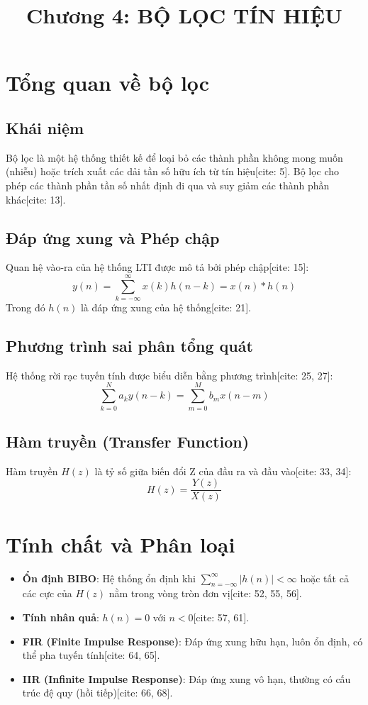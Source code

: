 \documentclass[12pt,a4paper]{article}
\title{Chương 4: BỘ LỌC TÍN HIỆU}
\date{}
\begin{document}
\maketitle

\section{Tổng quan về bộ lọc}
\subsection{Khái niệm}
Bộ lọc là một hệ thống thiết kế để loại bỏ các thành phần không mong muốn (nhiễu) hoặc trích xuất các dải tần số hữu ích từ tín hiệu[cite: 5]. Bộ lọc cho phép các thành phần tần số nhất định đi qua và suy giảm các thành phần khác[cite: 13].

\subsection{Đáp ứng xung và Phép chập}
Quan hệ vào-ra của hệ thống LTI được mô tả bởi phép chập[cite: 15]:
\begin{equation}
    y(n) = \sum_{k=-\infty}^{\infty} x(k)h(n-k) = x(n) * h(n)
\end{equation}
Trong đó $h(n)$ là đáp ứng xung của hệ thống[cite: 21].

\subsection{Phương trình sai phân tổng quát}
Hệ thống rời rạc tuyến tính được biểu diễn bằng phương trình[cite: 25, 27]:
\begin{equation}
    \sum_{k=0}^{N} a_k y(n-k) = \sum_{m=0}^{M} b_m x(n-m)
\end{equation}

\subsection{Hàm truyền (Transfer Function)}
Hàm truyền $H(z)$ là tỷ số giữa biến đổi Z của đầu ra và đầu vào[cite: 33, 34]:
\begin{equation}
    H(z) = \frac{Y(z)}{X(z)}
\end{equation}

\section{Tính chất và Phân loại}
\begin{itemize}
    \item \textbf{Ổn định BIBO}: Hệ thống ổn định khi $\sum_{n=-\infty}^{\infty} |h(n)| < \infty$ hoặc tất cả các cực của $H(z)$ nằm trong vòng tròn đơn vị[cite: 52, 55, 56].
    \item \textbf{Tính nhân quả}: $h(n) = 0$ với $n < 0$[cite: 57, 61].
    \item \textbf{FIR (Finite Impulse Response)}: Đáp ứng xung hữu hạn, luôn ổn định, có thể pha tuyến tính[cite: 64, 65].
    \item \textbf{IIR (Infinite Impulse Response)}: Đáp ứng xung vô hạn, thường có cấu trúc đệ quy (hồi tiếp)[cite: 66, 68].
\end{itemize}
\end{document}
